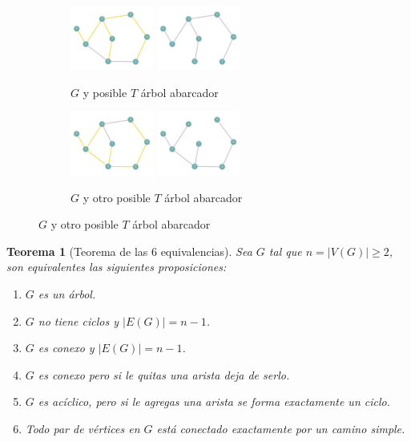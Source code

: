 \documentclass[a4paper,1pt]{report}
\newtheorem*{teo}{Teorema}
\begin{document}
\begin{figure}[H]
    \centering
    \begin{subfigure}[b]{0.8\textwidth}
    \centering
    \includegraphics[width=0.30\textwidth]{figures2/arbolA1.png}
    \includegraphics[width=0.30\textwidth]{figures2/T1.png}
    \caption{$G$ y posible $T$ \'arbol abarcador}
    \end{subfigure}
    \begin{subfigure}[b]{0.8\textwidth}
        \centering
    \includegraphics[width=0.30\textwidth]{figures2/arbolA2.png}
    \includegraphics[width=0.30\textwidth]{figures2/T2.png}
    \caption{$G$ y otro posible $T$ \'arbol abarcador}
    \end{subfigure}
\end{figure} 

\begin{teo}[Teorema de las 6 equivalencias]
Sea $G$ tal que $n = |V(G)| \geq 2$, son equivalentes las siguientes proposiciones:

\begin{enumerate}
    \item $G$ es un \'arbol.
    \item $G$ no tiene ciclos y $|E(G)| = n-1$.
    \item $G$ es conexo y $|E(G)| = n-1$.
    \item $G$ es conexo pero si le quitas una arista deja de serlo.
    \item $G$ es ac\'iclico, pero si le agregas una arista se forma exactamente un ciclo.
    \item Todo par de v\'ertices en $G$ est\'a conectado exactamente por un camino simple. 
\end{enumerate}
\end{teo}
\end{document}
